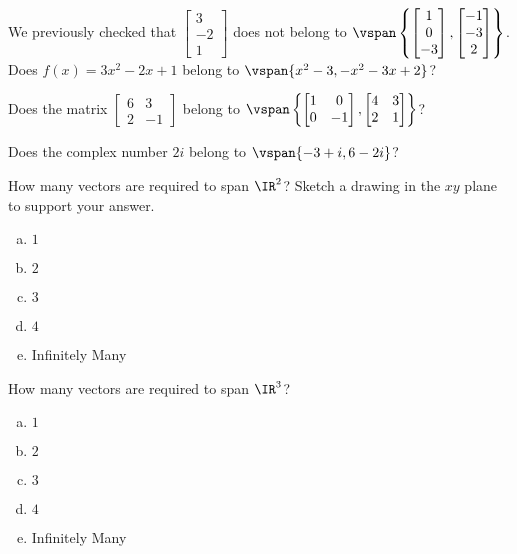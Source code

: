 \begin{applicationActivities}{3}{9}
\begin{activity}{5}
  We previously checked that \(\begin{bmatrix}3\\-2\\1\end{bmatrix}\)
  does not belong to
  \(\vspan\left\{\begin{bmatrix}1\\0\\-3\end{bmatrix},
  \begin{bmatrix}-1\\-3\\2\end{bmatrix}\right\}\).
  Does \(f(x)=3x^2-2x+1\) belong to
  \(\vspan\{x^2-3,-x^2-3x+2\}\)?
\end{activity}

\begin{activity}{10}
  Does the matrix \(\begin{bmatrix}6&3\\2&-1\end{bmatrix}\) belong to
  \(\vspan\left\{\begin{bmatrix}1&0\\0&-1\end{bmatrix},
  \begin{bmatrix}4&3\\2&1\end{bmatrix}\right\}\)?
\end{activity}

\begin{activity}{10}
  Does the complex number \(2i\) belong to
  \(\vspan\{-3+i,6-2i\}\)?
\end{activity}

\begin{activity}{10}
  How many vectors are required to span \(\IR^2\)?
  Sketch a drawing in the \(xy\) plane to support your answer.
  \begin{enumerate}[(a)]
  \item $1$
  \item $2$
  \item $3$
  \item $4$
  \item Infinitely Many
  \end{enumerate}
\end{activity}

\begin{activity}{5}
  How many vectors are required to span \(\IR^3\)?
  \begin{enumerate}[(a)]
  \item $1$
  \item $2$
  \item $3$
  \item $4$
  \item Infinitely Many
  \end{enumerate}
\end{activity}


\end{applicationActivities}
